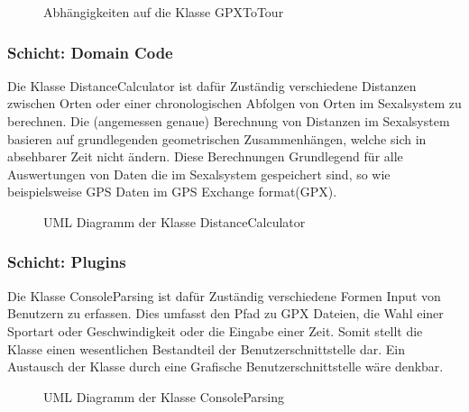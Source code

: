 \begin{figure}[H]
  \centering
  
  \caption{Abhängigkeiten auf die Klasse GPXToTour}
\end{figure}

\subsubsection{Schicht: Domain Code}

Die Klasse DistanceCalculator ist dafür Zuständig verschiedene Distanzen zwischen Orten oder einer chronologischen Abfolgen von Orten im Sexalsystem zu berechnen.
Die (angemessen genaue) Berechnung von Distanzen im Sexalsystem basieren auf grundlegenden geometrischen Zusammenhängen, welche sich in absehbarer Zeit nicht ändern. 
Diese Berechnungen Grundlegend für alle Auswertungen von Daten die im Sexalsystem gespeichert sind, so wie beispielsweise GPS Daten im GPS Exchange format(GPX).

\begin{figure}[H]
  \centering
  
  \caption{UML Diagramm der Klasse DistanceCalculator}
\end{figure}

\subsubsection{Schicht: Plugins}

Die Klasse ConsoleParsing ist dafür Zuständig verschiedene Formen Input von Benutzern zu erfassen. Dies umfasst den Pfad zu GPX Dateien, die Wahl einer Sportart oder Geschwindigkeit oder die Eingabe einer Zeit.
Somit stellt die Klasse einen wesentlichen Bestandteil der Benutzerschnittstelle dar.
Ein Austausch der Klasse durch eine Grafische Benutzerschnittstelle wäre denkbar.

\begin{figure}[H]
  \centering
  
  \caption{UML Diagramm der Klasse ConsoleParsing}
\end{figure}


